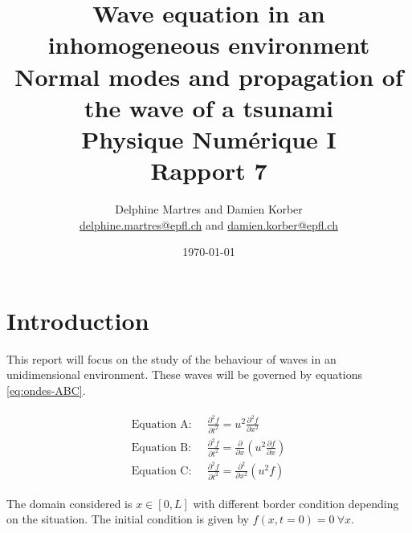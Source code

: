 \documentclass[a4paper,12pt,twoside]{article}
\newcommand{\mail}[1]{{\href{mailto:#1}{#1}}}
\newcommand{\bracket}[1]{\left(#1\right)}
\begin{document}
\title{Wave equation in an inhomogeneous environment\\{\normalsize Normal modes and propagation of the wave of a tsunami}\\{\small Physique Numérique I}\\{\small Rapport 7}}
\date{\today}
\author{Delphine Martres and Damien Korber\\{\small \mail{delphine.martres@epfl.ch} and \mail{damien.korber@epfl.ch}}}

\maketitle
\tableofcontents %


\baselineskip=16pt
\parindent=15pt
\parskip=5pt
\newpage


\section{Introduction}
  This report will focus on the study of the behaviour of waves in an unidimensional environment.
  These waves will be governed by equations \eqref{eq:ondes-ABC}.

  \begin{align}
    \begin{split}
      \text{Equation A: }&~\frac{\partial^2f}{\partial t^2}=u^2\frac{\partial^2f}{\partial x^2}\\
      \text{Equation B: }&~\frac{\partial^2f}{\partial t^2}=\frac{\partial}{\partial x}\bracket{u^2\frac{\partial f}{\partial x}}\\
      \text{Equation C: }&~\frac{\partial^2f}{\partial t^2}=\frac{\partial^2}{\partial x^2}\bracket{u^2f}
    \end{split}
    \label{eq:ondes-ABC}
  \end{align}

  The domain considered is $x\in\left[0,L\right]$ with different border condition depending on the situation.
  The initial condition is given by $f(x,t=0)=0~\forall x$.
\end{document}
